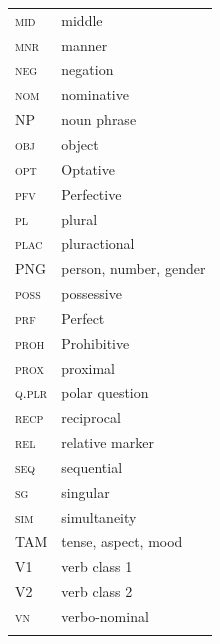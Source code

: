 \documentclass[output=paper,colorlinks,citecolor=brown]{langscibook}
\begin{document}
\begin{tabularx}{.45\textwidth}{lQ}
\textsc{mid}    & middle \\ 
\textsc{mnr}  &  manner  \\ 
\textsc{neg}    & negation \\ 
\textsc{nom}    & nominative \\ 
NP               & noun phrase \\ 
\textsc{obj}    & object \\ 
\textsc{opt}    & Optative  \\ 
\textsc{pfv}    & Perfective \\ 
\textsc{pl}     & plural \\ 
\textsc{plac}   & pluractional \\ 
PNG             & person, number, gender \\ 
\textsc{poss}   & possessive \\ 
\textsc{prf}    & Perfect  \\ 
\textsc{proh}   & Prohibitive \\ 
\textsc{prox}   & proximal \\ 
\textsc{q.plr}  & polar question \\ 
\textsc{recp}   & reciprocal \\ 
\textsc{rel}    & relative marker \\ 
\textsc{seq}   &  sequential  \\ 
\textsc{sg}     & singular \\ 
\textsc{sim}  &  simultaneity  \\ 
TAM             & tense, aspect, mood \\ 
V1              & verb class 1 \\ 
V2              & verb class 2 \\ 
\textsc{vn}     & verbo-nominal\\
\\
\end{tabularx}

\sloppy\printbibliography[heading=subbibliography,notkeyword=this]
\end{document}
